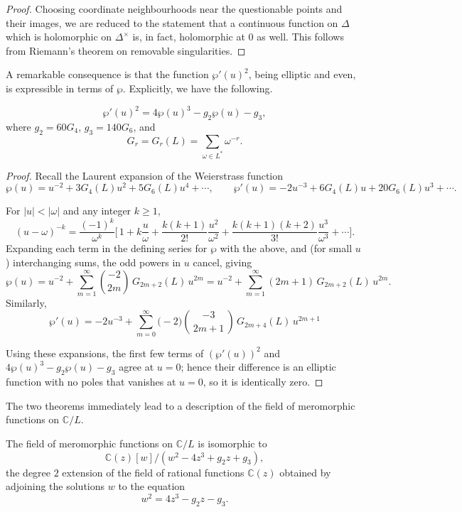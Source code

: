 \documentclass[12pt]{article}
\begin{document}
\begin{proof}
Choosing coordinate neighbourhoods near the questionable points and their images, we are reduced to the statement that a continuous function on $\Delta$ which is holomorphic on $\Delta^\times$ is, in fact, holomorphic at $0$ as well. This follows from Riemann's theorem on removable singularities.
\end{proof}

A remarkable consequence is that the function $\wp'(u)^2$, being elliptic and even, 
is expressible in terms of $\wp$. Explicitly, we have the following.

\begin{theorem}
\[
    \wp'(u)^2 = 4\wp(u)^3 - g_2 \wp(u) - g_3,
\]
where $g_2 = 60G_4$, $g_3 = 140G_6$, and
\[
    G_r = G_r(L) = \sum_{\omega \in L^*} \omega^{-r}.
\]
\end{theorem}

\begin{proof}
Recall the Laurent expansion of the Weierstrass function
\[
\wp(u)=u^{-2}+3G_4(L)u^{2}+5G_6(L)u^{4}+\cdots,
\qquad
\wp'(u)=-2u^{-3}+6G_4(L)u+20G_6(L)u^{3}+\cdots .
\]

For $|u|<|\omega|$ and any integer $k\ge1$,
\[
(u-\omega)^{-k}
=\frac{(-1)^k}{\omega^{k}}
\Bigg[\,1+k\frac{u}{\omega}+\frac{k(k+1)}{2!}\frac{u^{2}}{\omega^{2}}
+\frac{k(k+1)(k+2)}{3!}\frac{u^{3}}{\omega^{3}}+\cdots\Bigg].
\]
Expanding each term in the defining series for $\wp$ with the above, and (for small $u$) interchanging sums, the odd powers in $u$ cancel, giving
\[
\wp(u)=u^{-2}+\sum_{m=1}^{\infty}\binom{-2}{2m}\,G_{2m+2}(L)\,u^{2m}
= u^{-2}+\sum_{m=1}^{\infty}(2m+1)\,G_{2m+2}(L)\,u^{2m}.
\]
Similarly,
\[
\wp'(u)=-2u^{-3}
+\sum_{m=0}^{\infty}\big(-2\big)\binom{-3}{\,2m+1\,}\,G_{2m+4}(L)\,u^{2m+1}
\]

Using these expansions, the first few terms of $(\wp'(u))^{2}$ and
$4\wp(u)^{3}-g_{2}\wp(u)-g_{3}$ agree at $u=0$; hence their difference is an elliptic function
with no poles that vanishes at $u=0$, so it is identically zero. 
\end{proof}

The two theorems immediately lead to a description of the field of meromorphic functions on $\mathbb{C}/L$.

\begin{corollary}
The field of meromorphic functions on $\mathbb{C}/L$ is isomorphic to
\[
    \mathbb{C}(z)[w] \big/ (w^2 - 4z^3 + g_2 z + g_3),
\]
the degree $2$ extension of the field of rational functions $\mathbb{C}(z)$ obtained by adjoining the solutions 
$w$ to the equation 
\[
    w^2 = 4z^3 - g_2 z - g_3.
\]
\end{corollary}
\end{document}
